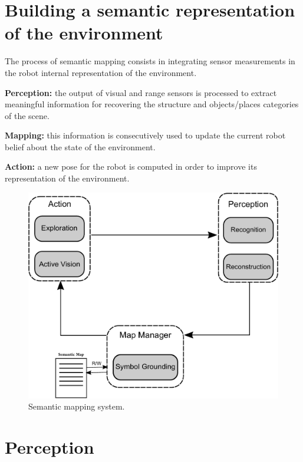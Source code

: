 \documentclass{article}
\begin{document}
	\section{Building a semantic representation of the environment}
	
	The process of semantic mapping consists in integrating sensor measurements in the robot internal representation of the environment.

	\begin{description}
		\item {\bf Perception:} the output of visual and range sensors is processed to extract meaningful information for recovering the structure and objects/places categories of the scene.
		\item {\bf Mapping:} this information is consecutively used to update the current robot belief about the state of the environment.
		\item {\bf Action:} a new pose for the robot is computed in order to improve its representation of the environment.
	\end{description}

	\begin{figure}[h]
		\centering
		\includegraphics[width=\linewidth]{pics/drawing-crop.pdf}
		\caption{Semantic mapping system.}
		\label{fig:pipeline}
	\end{figure}
		
	\section{Perception}
	
\end{document}
